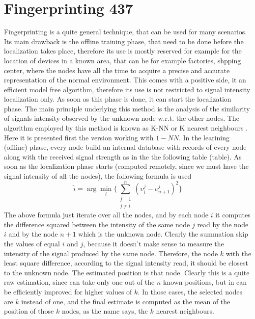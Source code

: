 \documentclass[12pt,twoside]{report}
\begin{document}
\section{Fingerprinting 437}
Fingerprinting \cite{YIU2017235} is a quite general technique, that can be used for many scenarios. Its main drawback is the offline training phase, that need to be done before the localization takes place, therefore its use is mostly reserved for example for the location of devices in a known area, that can be for example factories, shpping center, where the nodes have all the time to acquire a precise and accurate representation of the normal environment. This comes with a positive side, it an efficient model free algorithm, therefore its use is not restricted to signal intensity localization only. As soon as this phase is done, it can start the localization phase. The main principle underlying this method is the analysis of the similarity of signals intensity observed by the unknown node w.r.t. the other nodes. The algorithm employed by this method is known as K-NN or K nearest neighbours \cite{10.5555/1162264}. Here it is presented first the version working with $1-NN$.
In the learining (offline) phase, every node build an internal database with records of every node along with the received signal strength as in the the following table (table). As soon as the localization phase starts (computed remotely, since we must have the signal intensity of all the nodes), the following formula is used
\begin{equation}
    \hat{i}=\arg \min_i\bigg\{\sum_{\substack{j=1\\j\neq i}}^n(\upsilon_i^j-\upsilon_{n+1}^j)^2\bigg\}
\end{equation}
The above formula just iterate over all the nodes, and by each node $i$ it computes the difference squared between the intensity of the same node $j$ read by the node $i$ and by the node $n+1$ which is the unknown node. Clearly the summation skip the values of equal $i$ and $j$, because it doesn't make sense to measure the intensity of the signal produced by the same node. Therefore, the node $k$ with the least square difference, according to the signal intensity read, it should be closest to the unknown node. The estimated position is that node. Clearly this is a quite raw estimation, since can take only one out of the $n$ known positions, but in can be efficiently improved for higher values of $k$. In those cases, the selected nodes are $k$ instead of one, and the final estimate is computed as the mean of the position of those $k$ nodes, as the name says, the $k$ nearest neighbours.  
\end{document}
